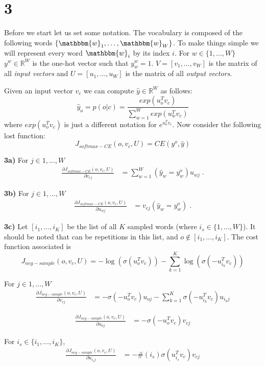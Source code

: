 \documentclass{article}
\newcommand{\wo}{\mathbbm{w}}
\begin{document}
\section{3}
Before we start let us set some notation. The vocabulary is composed of the following words $\{\wo_1, \dots ,\wo_W \}$. To make things simple we will represent every word $\wo_i$ by its index $i$. For $w \in \{1,\dots,W\}$ $y^{w}  \in \mathbb{R}^{W}$ is the one-hot vector such that $y^{w}_{w}=1$. $V = [v_1, \dots,v_W]$ is the matrix of all \textit{input vectors} and $U = [u_1, \dots,u_W]$ is the matrix of all \textit{output vectors}.

Given an input vector $v_c$ we can compute $\hat{y} \in \mathbb{R}^{W}$ as follows:
\[
\hat{y}_{o} = p(o|c) = \frac{exp(u_{o}^{T}v_{c})}{\sum_{w=1}^{W}exp(u_{w}^{T}v_{c})}
\]
where $exp(u_{o}^{T}v_{c})$ is just a different notation for $e^{u_{o}^{T}v_{c}}$. Now consider the following lost function:
\[
J_{softmax - CE}(o,v_c,U) = CE(y^{o},\hat{y})
\]

\textbf{3a)} For $ j \in {1,\dots,W}$
\begin{align*}
\frac{\partial J_{softmax - CE}(o,v_c,U)}{\partial v_{cj}}  & = \sum_{w=1}^{W}(\hat{y}_{w} = y^{o}_{w})u_{wj}\; .
\end{align*}

\textbf{3b)} For $ j \in {1,\dots,W}$
\begin{align*}
\frac{\partial J_{softmax - CE}(o,v_c,U)}{\partial u_{wj}}  & = v_{cj}(\hat{y}_{w} = y^{o}_{w})\; .
\end{align*}

\textbf{3c)} Let $[i_{1}, \dots, i_{K}]$ be the list of all $K$ sampled words (where $i_s \in \{1, \dots, W\}$). It should be noted that can be repetitions in this list, and $o \notin [i_{1}, \dots, i_{K}]$. The cost function associated is
\[
J_{neg - sample}(o,v_c,U) = - \log(\sigma(u_{o}^{T}v_{c})) - \sum_{k=1}^{K} \log(\sigma(-u_{i_{k}}^{T}v_{c}))
\]

For $ j \in {1,\dots,W}$
\begin{align*}
\frac{\partial J_{neg - sample}(o,v_c,U)}{\partial v_{cj}}  & = - \sigma(-u_{o}^{T}v_{c})u_{oj} - \sum_{k=1}^{K}\sigma(-u_{i_{k}}^{T}v_{c})u_{i_{k}j}
\end{align*}

\begin{align*}
\frac{\partial J_{neg - sample}(o,v_c,U)}{\partial u_{oj}}  & = - \sigma(-u_{o}^{T}v_{c})v_{cj}
\end{align*}

For $i_s \in \{i_{1}, \dots,i_{K}\}$,
\begin{align*}
\frac{\partial J_{neg - sample}(o,v_c,U)}{\partial u_{i_{s}j}}  & = - \#(i_s)\sigma(u_{i_{s}}^{T}v_{c})v_{cj}
\end{align*}
\end{document}
